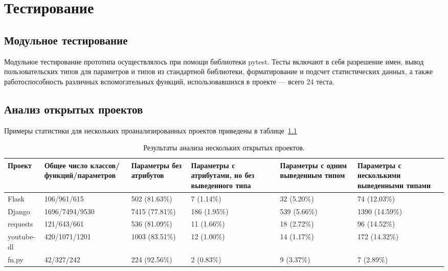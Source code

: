 \chapter{Тестирование}

\section{Модульное тестирование}
\label{sec:unit-testing}
Модульное тестирование прототипа осуществлялось при помощи библиотеки pytest.
Тесты включают в себя разрешение имен, вывод пользовательских типов для
параметров и типов из стандартной библиотеки, форматирование и подсчет
статистических данных, а также работоспособность различных вспомогательных
функций, использовавшихся в проекте --- всего 24 теста. 

\section{Анализ открытых проектов}
\label{sec:projects-analysis}

Примеры статистики для нескольких проанализированных проектов приведены в
таблице~\ref{tab:statistic-results-1}

\begin{table}[H]
  \scriptsize
  \caption{Результаты анализа нескольких открытых проектов.}
  \label{tab:statistic-results-1}
  \begin{tabularx}{\textwidth}{ |X|X|X|X|X|X| }
    \hline
    Проект & Общее число классов/функций/параметров & Параметры без атрибутов &
    Параметры с атрибутами, но без выведенного типа & 
    Параметры с одним выведенным типом & 
    Параметры с несколькими выведенными типами \\ \hline

    Flask & 106/961/615 & 502 (81.63\%) & 7 (1.14\%) & 32 (5.20\%) & 74 (12.03\%)
    \\ \hline

    Django & 1696/7494/9530 & 7415 (77.81\%) & 186 (1.95\%) & 539 (5.66\%) &
    1390 (14.59\%)
    \\ \hline

    requests & 121/643/661 & 536 (81.09\%) & 11 (1.66\%) & 18 (2.72\%) & 96
    (14.52\%)
    \\ \hline

    youtube-dl & 420/1071/1201 & 1003 (83.51\%) & 12 (1.00\%) & 14 (1.17\%)
    & 172 (14.32\%)
    \\ \hline

    fn.py & 42/327/242 &  224 (92.56\%) & 2 (0.83\%) & 9 (3.37\%) & 7
    (2.89\%)
    \\ \hline

  \end{tabularx}
\end{table}

